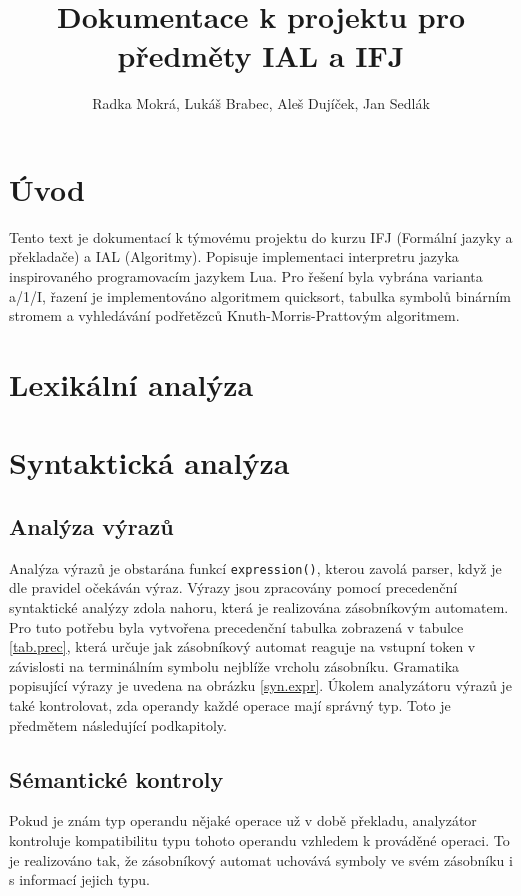 \documentclass[a4paper,11pt,titlepage]{article}
\author{Radka Mokrá, Lukáš Brabec, Aleš Dujíček, Jan Sedlák}
\title{Dokumentace k projektu pro předměty IAL a IFJ}
\begin{document}


\tableofcontents

\newpage

\section{Úvod}
Tento text je dokumentací k týmovému projektu do kurzu IFJ (Formální jazyky a překladače) a IAL (Algoritmy). Popisuje implementaci interpretru jazyka inspirovaného programovacím jazykem Lua. Pro řešení byla vybrána varianta a/1/I, řazení je implementováno algoritmem quicksort, tabulka symbolů binárním stromem a vyhledávání podřetězců Knuth-Morris-Prat\-to\-vým algoritmem.

\section{Lexikální analýza}


\section{Syntaktická analýza}



\subsection{Analýza výrazů}
Analýza výrazů je obstarána funkcí {\tt expression()}, kterou zavolá parser, když je dle pravidel očekáván výraz. Výrazy jsou zpracovány pomocí precedenční syntaktické analýzy zdola nahoru, která je realizována zásobníkovým automatem. Pro tuto potřebu byla vytvořena precedenční tabulka zobrazená v tabulce \ref{tab.prec}, která určuje jak zásobníkový automat reaguje na vstupní token v závislosti na terminálním symbolu nejblíže vrcholu zásobníku. Gramatika popisující výrazy je uvedena na obrázku \ref{syn.expr}.
Úkolem analyzátoru výrazů je také kontrolovat, zda operandy každé operace mají správný typ. Toto je předmětem následující podkapitoly.





\subsection{Sémantické kontroly}
Pokud je znám typ operandu nějaké operace už v době překladu, analyzátor kontroluje kompatibilitu typu tohoto operandu vzhledem k prováděné operaci. To je realizováno tak, že zásobníkový automat uchovává symboly ve svém zásobníku i s informací jejich typu.
\end{document}
